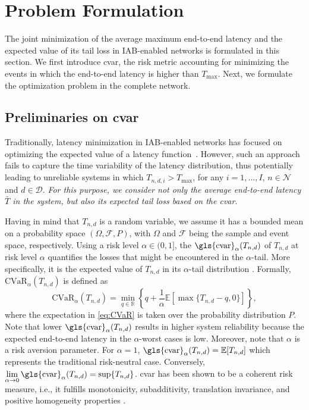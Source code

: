  \section{Problem Formulation}
\label{s:prob_formulation}
The joint minimization of the average maximum end-to-end latency and the expected value of its tail loss in IAB-enabled networks is formulated in this section. We first introduce \gls{cvar}, the risk metric accounting for minimizing the events in which the end-to-end latency is higher than $T_\mathrm{max}$. Next, we formulate the optimization problem in the complete network.
 
\subsection{Preliminaries on \gls{cvar}}
Traditionally, latency minimization in IAB-enabled networks has focused on optimizing the expected value of a latency function~\cite{vu2018path, ortiz2019scaros}.
However, such an approach fails to capture the time variability of the latency distribution, thus potentially leading to unreliable systems in which $T_{n,d,i}>T_\mathrm{max}$, for any  $i=1,...,I$, $n\in \mathcal{N}$ and $d\in\mathcal{D}$.
\textit{For this purpose, we consider not only the average end-to-end latency $\bar{T}$ in the system, but also its expected tail loss based on the \gls{cvar}}\cite{Rockafellar2000, Rockafellar2002}.

Having in mind that $T_{n,d}$ is a random variable, we assume it has a bounded mean on a probability space $(\Omega, \mathcal{F}, P)$, with $\Omega$ and  $\mathcal{F}$ being the sample and event space, respectively.
Using a risk level $\alpha\in(0,1]$, the $\mathrm{\gls{cvar}}_\alpha(T_{n,d})$ of $T_{n,d}$ at risk level $\alpha$ quantifies the losses that might be encountered in the $\alpha$-tail. More specifically, it is the expected value of $T_{n,d}$ in its $\alpha$-tail distribution \cite{Rockafellar2002}. 
Formally, $\mathrm{CVaR}_\alpha(T_{n,d})$ is defined as \cite{Rockafellar2000}
\begin{equation}
    \mathrm{CVaR}_\alpha(T_{n,d}) = \min_{q\in\mathbb{R}}\left\{q+\frac{1}{\alpha}\mathbb{E}\left[\max\{T_{n,d}-q,0\}\right]\right\},
    \label{eq:CVaR}
\end{equation}
where the expectation in \eqref{eq:CVaR} is taken over the probability distribution $P$. 
Note that lower $\mathrm{\gls{cvar}}_\alpha(T_{n,d})$ results in higher system reliability because the expected end-to-end latency in the $\alpha$-worst cases is low.
Moreover, note that $\alpha$ is a risk aversion parameter. For $\alpha=1$,  $\mathrm{\gls{cvar}}_\alpha(T_{n,d}) = \mathbb{E}[T_{n,d}]$ which represents the traditional risk-neutral case. 
Conversely, 
$\lim\limits_{\alpha\rightarrow 0}\mathrm{\gls{cvar}}_\alpha(T_{n,d}) = \sup\{T_{n,d}\}$.
\gls{cvar} has been shown to be a coherent risk measure, i.e., it fulfills monotonicity, subadditivity, translation invariance, and positive homogeneity properties \cite{Pflug2000}. 

